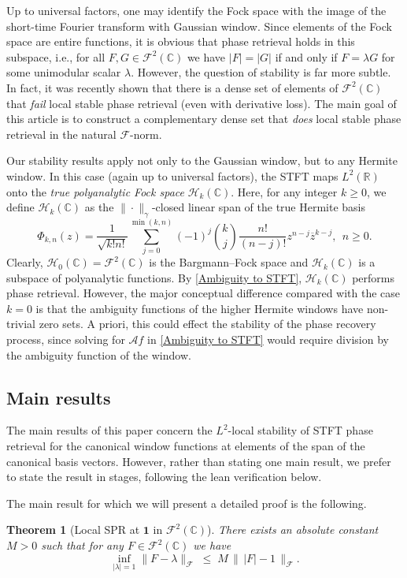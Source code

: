 \documentclass[11pt]{amsart}
\newtheorem{theorem}{Theorem}[section]
\theoremstyle{remark}
\begin{document}
Up to universal factors, one may identify the Fock space with the image of the short-time Fourier transform with Gaussian window.
Since elements of the Fock space are entire functions, it is obvious that phase retrieval holds in this subspace, i.e., for all $F,G\in \mathcal{F}^2(\mathbb{C})$ we have $|F|=|G|$ if and only if $F=\lambda G$ for some unimodular scalar $\lambda$. However, the question of stability is far more subtle. In fact, it was recently shown that there is a dense set of elements of $\mathcal{F}^2(\mathbb{C})$ that \emph{fail} local stable phase retrieval (even with derivative loss). The main goal of this article is to construct a complementary dense set that \emph{does} local stable phase retrieval in the natural $\mathcal{F}$-norm.
\medskip

Our stability results  apply not only to the Gaussian window, but to any Hermite window. In this case (again up to universal factors), the STFT maps $L^2(\mathbb{R})$ onto the \emph{true polyanalytic Fock space} $\mathcal{H}_k(\mathbb{C})$. Here, for any integer $k\geq 0$, we define $\mathcal{H}_k(\mathbb{C})$ as the $\|\cdot\|_\gamma$-closed linear span of the true Hermite basis
\begin{equation*}
    \Phi_{k,n}(z)=\frac{1}{\sqrt{k!n!}}\sum_{j=0}^{\min(k,n)}(-1)^j{k\choose j}\frac{n!}{(n-j)!}z^{n-j}\overline{z}^{k-j}, \ \ n\geq 0.
\end{equation*}
Clearly, $\mathcal{H}_0(\mathbb{C})=\mathcal{F}^2(\mathbb{C})$ is the Bargmann--Fock space and $\mathcal{H}_k(\mathbb{C})$ is a subspace of polyanalytic functions. By \eqref{Ambiguity to STFT}, $\mathcal{H}_k(\mathbb{C})$  performs phase retrieval. However, the major conceptual difference compared with the case $k=0$ is that the ambiguity functions of the higher Hermite windows have non-trivial zero sets. A priori, this could effect the stability of the phase recovery process, since solving for $\mathcal{A}f$ in \eqref{Ambiguity to STFT} would require division by the ambiguity function of the window.
\subsection{Main results}
The main results of this paper concern the $L^2$-local stability of STFT phase retrieval for the canonical window functions at elements of the span of the canonical basis vectors. However, rather than stating one main result, we prefer to state the result in stages, following the lean verification below.
\medskip

The main result for which we will present a detailed proof is the following.
\begin{theorem}[Local SPR at $\mathbf{1}$ in $\mathcal{F}^2(\mathbb{C})$]\label{main:local}
There exists an absolute constant $M> 0$ such
that for any $F\in \mathcal{F}^2(\mathbb{C})$ we have
\[
\inf_{|\lambda|=1}\lVert F - \lambda \rVert_\mathcal{F}
\;\le\;
M\,
\bigl\|\, \lvert F \rvert - 1 \,\bigr\|_{\mathcal{F}}.
\]
\end{theorem}
\end{document}
